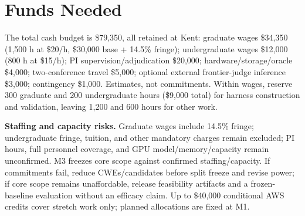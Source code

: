 \documentclass[11pt]{article}
\begin{document}
\section*{Funds Needed}
The total cash budget is \$79,350, all retained at Kent: graduate wages \$34,350 (1,500 h at \$20/h, \$30,000 base + 14.5\% fringe); undergraduate wages \$12,000 (800 h at \$15/h); PI supervision/adjudication \$20,000; hardware/storage/oracle \$4,000; two-conference travel \$5,000; optional external frontier-judge inference \$3,000; contingency \$1,000. Estimates, not commitments. Within wages, reserve 300 graduate and 200 undergraduate hours (\$9,000 total) for harness construction and validation, leaving 1,200 and 600 hours for other work.

\textbf{Staffing and capacity risks.} Graduate wages include 14.5\% fringe; undergraduate fringe, tuition, and other mandatory charges remain excluded; PI hours, full personnel coverage, and GPU model/memory/capacity remain unconfirmed. M3 freezes core scope against confirmed staffing/capacity. If commitments fail, reduce CWEs/candidates before split freeze and revise power; if core scope remains unaffordable, release feasibility artifacts and a frozen-baseline evaluation without an efficacy claim. Up to \$40,000 conditional AWS credits cover stretch work only; planned allocations are fixed at M1.
\clearpage
\end{document}
